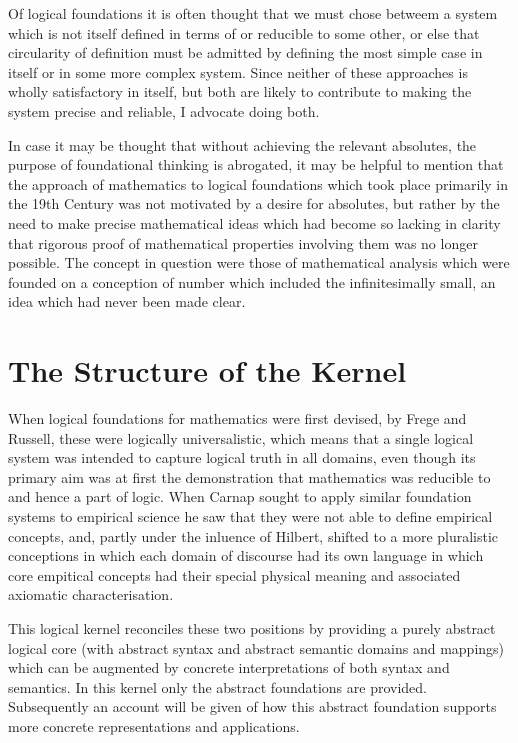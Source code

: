 Of logical foundations it is often thought that we must chose betweem a system which is not itself defined in terms of or reducible to some other, or else that circularity of definition must be admitted by defining the most simple case in itself or in some more complex system.
Since neither of these approaches is wholly satisfactory in itself, but both are likely to contribute to making the system precise and reliable, I advocate doing both.

In case it may be thought that without achieving the relevant absolutes, the purpose of foundational thinking is abrogated, it may be helpful to mention that the approach of mathematics to logical foundations which took place primarily in the 19th Century was not motivated by a desire for absolutes, but rather by the need to make precise mathematical ideas which had become so lacking in clarity that rigorous proof of mathematical properties involving them was no longer possible.
The concept in question were those of mathematical analysis which were founded on a conception of number which included the infinitesimally small, an idea which had never been made clear.

\section{The Structure of the Kernel}

When logical foundations for mathematics were first devised, by Frege and Russell, these were logically universalistic, which means that a single logical system was intended to capture logical truth in all domains, even though its primary aim was at first the demonstration that mathematics was reducible to and hence a part of logic.
When Carnap sought to apply similar foundation systems to empirical science he saw that they were not able to define empirical concepts, and, partly under the inluence of Hilbert, shifted to a more pluralistic conceptions in which each domain of discourse had its own language in which core empitical concepts had their special physical meaning and associated axiomatic characterisation.

This logical kernel reconciles these two positions by providing a purely abstract logical core (with abstract syntax and abstract semantic domains and mappings) which can be augmented by concrete interpretations of both syntax and semantics.
In this kernel only the abstract foundations are provided.
Subsequently an account will be given of how this abstract foundation supports more concrete representations and applications.


